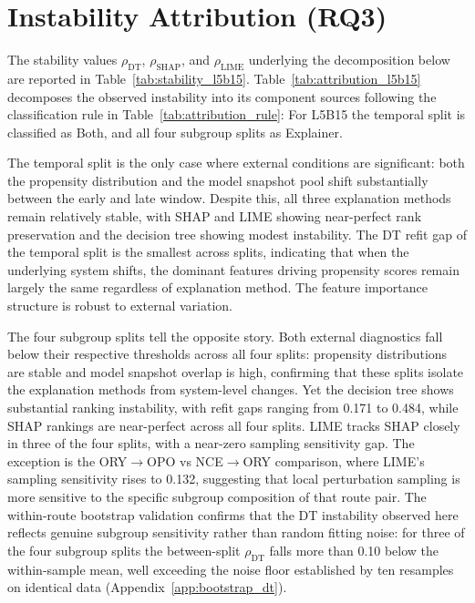 \documentclass[oneside]{memoir} %
\begin{document}
\section{Instability Attribution (RQ3)} \label{sec:rq3}

The stability values $\rho_{\text{DT}}$, $\rho_{\text{SHAP}}$, and $\rho_{\text{LIME}}$ underlying the decomposition below are reported in Table~\ref{tab:stability_l5b15}. Table~\ref{tab:attribution_l5b15} decomposes the observed instability into its component sources following the classification rule in Table~\ref{tab:attribution_rule}: For L5B15 the temporal split is classified as Both, and all four subgroup splits as Explainer.



The temporal split is the only case where external conditions are significant: both the propensity distribution and the model snapshot pool shift substantially between the early and late window. Despite this, all three explanation methods remain relatively stable, with SHAP and LIME showing near-perfect rank preservation and the decision tree showing modest instability. The DT refit gap of the temporal split is the smallest across splits, indicating that when the underlying system shifts, the dominant features driving propensity scores remain largely the same regardless of explanation method. The feature importance structure is robust to external variation.

The four subgroup splits tell the opposite story. Both external diagnostics fall below their respective thresholds across all four splits: propensity distributions are stable and model snapshot overlap is high, confirming that these splits isolate the explanation methods from system-level changes. Yet the decision tree shows substantial ranking instability, with refit gaps ranging from 0.171 to 0.484, while SHAP rankings are near-perfect across all four splits. LIME tracks SHAP closely in three of the four splits, with a near-zero sampling sensitivity gap. The exception is the ORY$\to$OPO vs NCE$\to$ORY comparison, where LIME's sampling sensitivity rises to 0.132, suggesting that local perturbation sampling is more sensitive to the specific subgroup composition of that route pair. The within-route bootstrap validation confirms that the DT instability observed here reflects genuine subgroup sensitivity rather than random fitting noise: for three of the four subgroup splits the between-split $\rho_{\text{DT}}$ falls more than 0.10 below the within-sample mean, well exceeding the noise floor established by ten resamples on identical data (Appendix~\ref{app:bootstrap_dt}).
\end{document}
